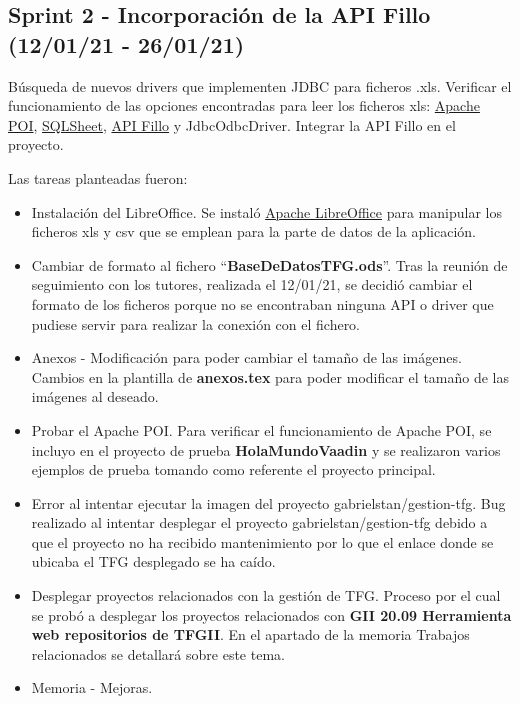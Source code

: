 
\subsection{Sprint 2 - Incorporación de la API Fillo (12/01/21 - 26/01/21)}
Búsqueda de nuevos drivers que implementen JDBC para ficheros .xls. Verificar el funcionamiento de las opciones encontradas para leer los ficheros xls: \href{https://poi.apache.org/}{Apache POI}, \href{https://code.google.com/archive/p/sqlsheet/}{SQLSheet}, \href{https://codoid.com/fillo/}{API Fillo} y JdbcOdbcDriver. Integrar la API Fillo en el proyecto. 

Las tareas planteadas fueron:
\begin{itemize}
	\item Instalación del LibreOffice. 
		Se instaló \href{https://es.libreoffice.org/}{Apache LibreOffice} para manipular los ficheros xls y csv que se emplean para la parte de datos de la aplicación.
	\item Cambiar de formato al fichero ``\textbf{BaseDeDatosTFG.ods}''. 
		Tras la reunión de seguimiento con los tutores, realizada el 12/01/21, se decidió cambiar el formato de los ficheros porque no se encontraban ninguna API o driver que pudiese servir para realizar la conexión con el fichero.
	\item Anexos - Modificación para poder cambiar el tamaño de las imágenes.
		Cambios en la plantilla de \textbf{anexos.tex} para poder modificar el tamaño de las imágenes al deseado.
	\item Probar el Apache POI. 
		Para verificar el funcionamiento de Apache POI, se incluyo en el proyecto de prueba \textbf{HolaMundoVaadin} y se realizaron varios ejemplos de prueba tomando como referente el proyecto principal.
	\item Error al intentar ejecutar la imagen del proyecto gabrielstan/gestion-tfg. 
		Bug realizado al intentar desplegar el proyecto  gabrielstan/gestion-tfg debido a que el proyecto no ha recibido mantenimiento por lo que el enlace donde se ubicaba el TFG desplegado se ha caído. 
	\item Desplegar proyectos relacionados con la gestión de TFG. 
		Proceso por el cual se probó a desplegar los proyectos relacionados con \textbf{GII 20.09 Herramienta web repositorios de TFGII}. En el apartado de la memoria Trabajos relacionados se detallará sobre este tema. 
	\item Memoria - Mejoras.

\end{itemize}
